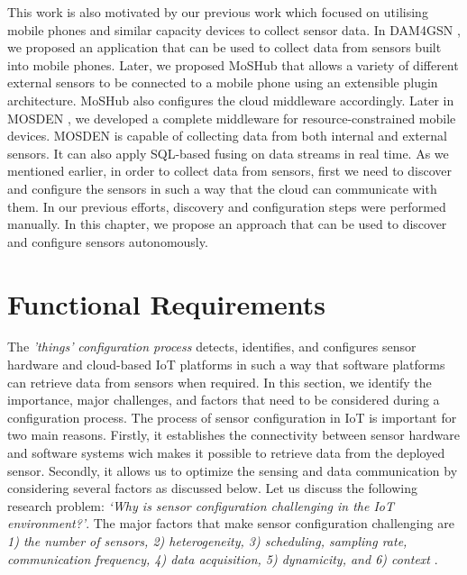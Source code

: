 \documentclass[graybox]{svmult}
\newcommand{\things}{\textit{'things' }}
\begin{document}
This work is also motivated by our previous work which focused on utilising mobile phones and similar capacity devices to collect sensor data. In DAM4GSN \cite{ZMP001}, we proposed an application that can be used to collect data from sensors built  into mobile phones. Later, we proposed MoSHub \cite{ZMP005} that allows a variety of different external sensors to be connected to a mobile phone using an extensible plugin architecture. MoSHub also configures the cloud middleware accordingly. Later in MOSDEN \cite{ZMP009}, we developed a complete middleware for resource-constrained mobile devices. MOSDEN is capable of collecting data from both internal and external sensors. It can also apply SQL-based fusing on data streams in real time. As we mentioned earlier, in order to collect data from sensors, first we need to discover and configure the sensors in such a way that the cloud can communicate with them. In our previous efforts, discovery and configuration steps were performed manually. In this chapter, we propose an approach that can be used to discover and configure sensors autonomously.




\vspace{-8pt}
\section{Functional Requirements}
\label{sec:Functional_Requirements}

The \things \textit{configuration process} detects, identifies, and configures sensor hardware and cloud-based IoT platforms in such a way that software platforms can retrieve data from sensors when required. In this section, we identify the importance, major challenges, and factors that need to be considered during a configuration process. The process of sensor configuration in IoT is important for two main reasons. Firstly, it establishes the connectivity between sensor hardware and software systems wich makes it possible to  retrieve data from the  deployed sensor. Secondly, it allows us to optimize the sensing and data communication by considering several factors as discussed below.  Let us discuss the following research problem:\textit{ ‘Why is sensor configuration challenging in the IoT environment?’}. The major factors that make sensor configuration challenging are \textit{1) the number of sensors, 2) heterogeneity, 3) scheduling, sampling rate, communication frequency, 4) data acquisition, 5) dynamicity, and 6) context} \cite{ZMP007}.
\end{document}
